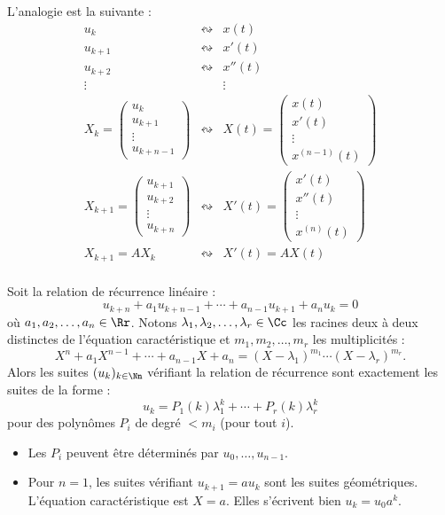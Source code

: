 \documentclass[12pt, class=report,crop=false]{standalone}
\begin{document}
L'analogie est la suivante :
$$\begin{array}{ccc}
u_k & \leftrightsquigarrow & x(t) \\
u_{k+1} & \leftrightsquigarrow & x'(t) \\
u_{k+2} & \leftrightsquigarrow & x''(t) \\
\vdots  & & \vdots \\
X_k = \begin{pmatrix}u_k\\u_{k+1}\\\vdots\\u_{k+n-1}\end{pmatrix} & \leftrightsquigarrow & 
X(t)  = \begin{pmatrix} x(t) \\ x'(t) \\ \vdots \\ x^{(n-1)}(t) \end{pmatrix}\\
X_{k+1} = \begin{pmatrix}u_{k+1}\\u_{k+2}\\\vdots\\u_{k+n}\end{pmatrix} & \leftrightsquigarrow & X'(t) =\begin{pmatrix} x'(t) \\ x''(t) \\  \vdots \\ x^{(n)}(t) \end{pmatrix} \\
X_{k+1} = A X_k & \leftrightsquigarrow & X'(t)=AX(t) \\
\end{array}$$

\begin{theoreme}
Soit la relation de récurrence linéaire :
$$u_{k+n} + a_1 u_{k+n-1}+ \cdots+ a_{n-1}u_{k+1} +a_n u_k=0$$
où $a_1,a_2,\ldots,a_n \in \Rr$.
Notons $\lambda_1, \lambda_2,\ldots,\lambda_r \in \Cc$ les racines deux à deux distinctes de l'équation 
caractéristique et $m_1,m_2,\ldots,m_r$ les multiplicités :
\[X^n+a_1X^{n-1}+ \cdots +a_{n-1}X+a_n = (X-\lambda_1)^{m_1}\cdots(X-\lambda_r)^{m_r}.\]
Alors les suites $(u_k)_{k\in\Nn}$ vérifiant la relation de récurrence sont exactement les suites de la forme :
\[ u_k = P_1(k) \lambda_1^k + \cdots + P_r(k) \lambda_r^k \]
pour des polynômes $P_i$ de degré $< m_i$ (pour tout $i$).
\end{theoreme}


\begin{remarque*}
\sauteligne
\begin{itemize}
  \item Les $P_i$ peuvent être déterminés par $u_0,\ldots,u_{n-1}$.
  \item Pour $n=1$, les suites vérifiant $u_{k+1} = a u_k$ sont les suites géométriques.
  L'équation caractéristique est $X=a$. Elles s'écrivent bien $u_k = u_0 a^k$.
\end{itemize}
\end{remarque*}
\end{document}
